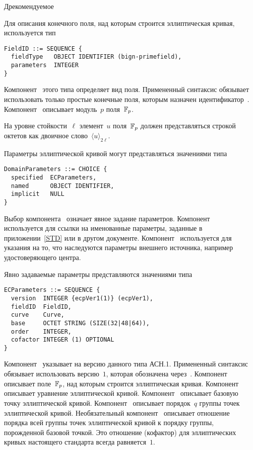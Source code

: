\begin{appendix}{Д}{рекомендуемое}
\label{ASN.Field}

Для описания конечного поля, над которым строится эллиптическая кривая, 
используется тип
\begin{verbatim}
FieldID ::= SEQUENCE {
  fieldType   OBJECT IDENTIFIER (bign-primefield),
  parameters  INTEGER
}
\end{verbatim}

Компонент~ этого типа определяет вид поля.
Примененный синтаксис обязывает использовать только простые 
конечные поля, которым назначен идентификатор~.
Компонент~ описывает модуль~$p$ поля~$\mathbb{F}_p$.

На уровне стойкости~$\ell$
элемент~$u$ поля~$\mathbb{F}_p$ должен представляться строкой 
октетов как двоичное слово~$\langle u\rangle_{2\ell}$.

\label{ASN.EC}

Параметры эллиптической кривой 
могут представляться значениями типа
\begin{verbatim}
DomainParameters ::= CHOICE {
  specified  ECParameters,
  named      OBJECT IDENTIFIER,
  implicit   NULL 
}
\end{verbatim}

Выбор компонента~ означает явное задание параметров. 
%
Компонент~ используется для ссылки на именованные параметры, 
заданные в приложении~\ref{STD} или в другом документе.
%
Компонент~ используется для указания на то, что наследуются
параметры внешнего источника, например удостоверяющего центра.

Явно задаваемые параметры представляются значениями типа
\begin{verbatim}
ECParameters ::= SEQUENCE {
  version  INTEGER {ecpVer1(1)} (ecpVer1),
  fieldID  FieldID,
  curve    Curve,
  base     OCTET STRING (SIZE(32|48|64)),
  order    INTEGER,
  cofactor INTEGER (1) OPTIONAL
}
\end{verbatim}

Компонент~ указывает на версию данного типа АСН.1.
Примененный синтаксис обязывает использовать версию~$1$,
которая обозначена через~.
%
Компонент~ описывает поле~$\mathbb{F}_p$, 
над которым строится эллиптическая кривая.
%
Компонент~ описывает уравнение эллиптической кривой.
%
Компонент~ описывает базовую точку эллиптической кривой.
%
Компонент~ описывает порядок~$q$ 
группы точек эллиптической кривой.
%
Необязательный компонент~ описывает отношение
порядка всей группы точек эллиптической кривой к порядку группы, 
порожденной базовой точкой.                        
Это отношение (кофактор) для эллиптических кривых
настоящего стандарта всегда равняется~$1$.


\end{appendix}
